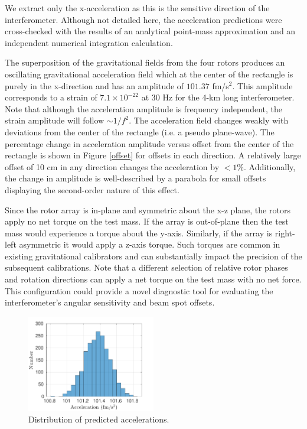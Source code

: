 \documentclass[superscriptaddress, twocolumn, prd]{revtex4-1}
\begin{document}
\noindent We extract only the x-acceleration as this is the sensitive direction of the interferometer. Although not detailed here, the acceleration predictions were cross-checked with the results of an analytical point-mass approximation \cite{ncal} and an independent  numerical integration calculation.

The superposition of the gravitational fields from the four rotors produces an oscillating gravitational acceleration field which at the center of the rectangle is purely in the x-direction and has an amplitude of $101.37$ fm/s$^2$. This amplitude corresponds to a strain of $7.1\times10^{-22}$ at 30 Hz for the 4-km long interferometer. Note that although the acceleration amplitude is frequency independent, the strain amplitude will follow $\sim1/f^2$. The acceleration field changes weakly with deviations from the center of the rectangle (i.e. a pseudo plane-wave). The percentage change in acceleration amplitude versus offset from the center of the rectangle is shown in Figure \ref{offset} for offsets in each direction. A relatively large offset of 10 cm in any direction changes the acceleration by $<1\%$. Additionally, the change in amplitude is well-described by a parabola for small offsets displaying the second-order nature of this effect. 


Since the rotor array is in-plane and symmetric about the x-z plane, the rotors apply no net torque on the test mass. If the array is out-of-plane then the test mass would experience a torque about the y-axis. Similarly, if the array is right-left asymmetric it would apply a z-axis torque. Such torques are common in existing gravitational calibrators and can substantially impact the precision of the subsequent calibrations. \cite{ncal} Note that a different selection of relative rotor phases and rotation directions can apply a net torque on the test mass with no net force. This configuration could provide a novel diagnostic tool for evaluating the interferometer's angular sensitivity and beam spot offsets.

\begin{figure}[!h]
\centering \includegraphics[width=0.5\textwidth]{Super4_Dist.pdf}
\caption{Distribution of predicted accelerations.}
\label{dist} 
\end{figure}
\end{document}
